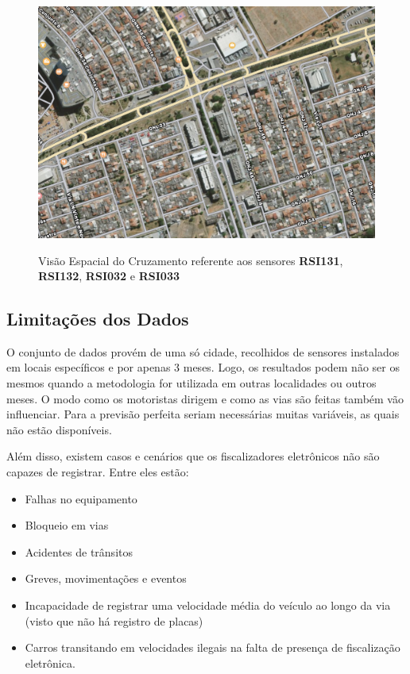 \begin{figure}[htbp]
    \centering
    \includegraphics[scale=0.6]{monography/img/maps/cruzamento_2.png}
    \label{figure:helio_cruzamento_2}
    \caption[Visão Espacial do Cruzamento referente aos sensores \textbf{RSI131}, \textbf{RSI132}, \textbf{RSI032} e \textbf{RSI033}]{Visão Espacial do Cruzamento referente aos sensores \textbf{RSI131}, \textbf{RSI132}, \textbf{RSI032} e \textbf{RSI033}}
\end{figure}

\subsection{Limitações dos Dados}

O conjunto de dados provém de uma só cidade, recolhidos de sensores instalados em locais específicos e por apenas 3 meses. Logo, os resultados podem não ser os mesmos quando a metodologia for utilizada em outras localidades ou outros meses. O modo como os motoristas dirigem e como as vias são feitas também vão influenciar. Para a previsão perfeita seriam necessárias muitas variáveis, as quais não estão disponíveis.

Além disso, existem casos e cenários que os fiscalizadores eletrônicos não são capazes de registrar. Entre eles estão:

\begin{itemize}
    \item Falhas no equipamento
    \item Bloqueio em vias
    \item Acidentes de trânsitos
    \item Greves, movimentações e eventos
    \item Incapacidade de registrar uma velocidade média do veículo ao longo da via (visto que não há registro de placas)
    \item Carros transitando em velocidades ilegais na falta de presença de fiscalização eletrônica.
\end{itemize}

